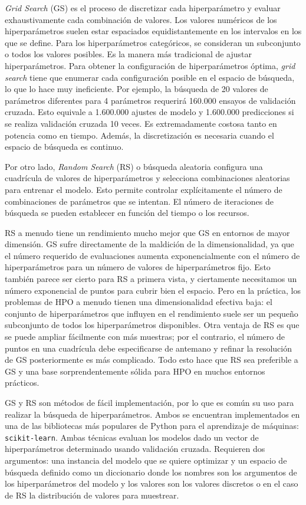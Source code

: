 \textit{Grid Search} (GS) es el proceso de discretizar cada hiperparámetro y evaluar exhaustivamente cada combinación de valores. Los valores numéricos de los hiperparámetros suelen estar espaciados equidistantemente en los intervalos en los que se define. Para los hiperparámetros categóricos, se consideran un subconjunto o todos los valores posibles. Es la manera más tradicional de ajustar hiperparámetros. Para obtener la configuración de hiperparámetros óptima, \textit{grid search} tiene que enumerar cada configuración posible en el espacio de búsqueda, lo que lo hace muy ineficiente. Por ejemplo, la búsqueda de 20 valores de parámetros diferentes para 4 parámetros requerirá 160.000 ensayos de validación cruzada. Esto equivale a 1.600.000 ajustes de modelo y 1.600.000 predicciones si se realiza validación cruzada 10 veces. Es extremadamente costosa tanto en potencia como en tiempo. Además, la discretización es necesaria cuando el espacio de búsqueda es continuo.

Por otro lado, \textit{Random Search} (RS) o búsqueda aleatoria configura una cuadrícula de valores de hiperparámetros y selecciona combinaciones aleatorias para entrenar el modelo. Esto permite controlar explícitamente el número de combinaciones de parámetros que se intentan. El número de iteraciones de búsqueda se pueden establecer en función del tiempo o los recursos.

RS a menudo tiene un rendimiento mucho mejor que GS en entornos de mayor dimensión. GS sufre directamente de la maldición de la dimensionalidad, ya que el número requerido de evaluaciones aumenta exponencialmente con el número de hiperparámetros para un número de valores de hiperparámetros fijo. Esto también parece ser cierto para RS a primera vista, y ciertamente necesitamos un número exponencial de puntos para cubrir bien el espacio. Pero en la práctica, los problemas de HPO a menudo tienen una dimensionalidad efectiva baja: el conjunto de hiperparámetros que influyen en el rendimiento suele ser un pequeño subconjunto de todos los hiperparámetros disponibles. Otra ventaja de RS es que se puede ampliar fácilmente con más muestras; por el contrario, el número de puntos en una cuadrícula debe especificarse de antemano y refinar la resolución de GS posteriormente es más complicado. Todo esto hace que RS sea preferible a GS y una base sorprendentemente sólida para HPO en muchos entornos prácticos.

GS y RS son métodos de fácil implementación, por lo que es común su uso para realizar la búsqueda de hiperparámetros. Ambos se encuentran implementados en una de las bibliotecas más populares de Python para el aprendizaje de máquinas: \texttt{scikit-learn}. Ambas técnicas evaluan los modelos dado un vector de hiperparámetros determinado usando validación cruzada. Requieren dos argumentos: una instancia del modelo que se quiere optimizar y un espacio de búsqueda definido como un diccionario donde los nombres son los argumentos de los hiperparámetros del modelo y los valores son los valores discretos o en el caso de RS la distribución de valores para muestrear.

